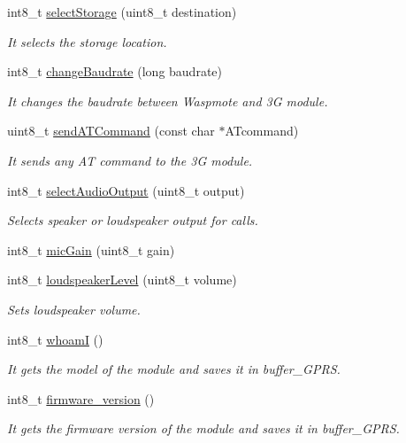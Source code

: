 \begin{DoxyCompactItemize}
int8\+\_\+t \hyperlink{class_wasp3_g_a5bc14fafa81d605e5436eec41e4a783f}{select\+Storage} (uint8\+\_\+t destination)
\begin{DoxyCompactList}\small\item\em It selects the storage location. \end{DoxyCompactList}\item 
int8\+\_\+t \hyperlink{class_wasp3_g_a155f2b28697c19a0777c3aebed62478b}{change\+Baudrate} (long baudrate)
\begin{DoxyCompactList}\small\item\em It changes the baudrate between Waspmote and 3G module. \end{DoxyCompactList}\item 
uint8\+\_\+t \hyperlink{class_wasp3_g_a09814b544568a07f5d58e25265954fb9}{send\+A\+T\+Command} (const char $\ast$A\+Tcommand)
\begin{DoxyCompactList}\small\item\em It sends any AT command to the 3G module. \end{DoxyCompactList}\item 
int8\+\_\+t \hyperlink{class_wasp3_g_a1213b6affbd04621ab7aaa1787b7d4d7}{select\+Audio\+Output} (uint8\+\_\+t output)
\begin{DoxyCompactList}\small\item\em Selects speaker or loudspeaker output for calls. \end{DoxyCompactList}\item 
int8\+\_\+t \hyperlink{class_wasp3_g_a8c6d4eb2d64d3e5653dc2694dff3a6cb}{mic\+Gain} (uint8\+\_\+t gain)
\item 
int8\+\_\+t \hyperlink{class_wasp3_g_a00e5df6c7a0b502fc978a5e731c11cb4}{loudspeaker\+Level} (uint8\+\_\+t volume)
\begin{DoxyCompactList}\small\item\em Sets loudspeaker volume. \end{DoxyCompactList}\item 
int8\+\_\+t \hyperlink{class_wasp3_g_a834dc95311fcb1f9ca2c385ec4e4d9aa}{whoamI} ()
\begin{DoxyCompactList}\small\item\em It gets the model of the module and saves it in \textquotesingle{}buffer\+\_\+\+G\+P\+RS\textquotesingle{}. \end{DoxyCompactList}\item 
int8\+\_\+t \hyperlink{class_wasp3_g_afe3b4bfb75fcb43fe16d0249fb6d6cbe}{firmware\+\_\+version} ()
\begin{DoxyCompactList}\small\item\em It gets the firmware version of the module and saves it in \textquotesingle{}buffer\+\_\+\+G\+P\+RS\textquotesingle{}. \end{DoxyCompactList}\item 

\end{DoxyCompactItemize}
